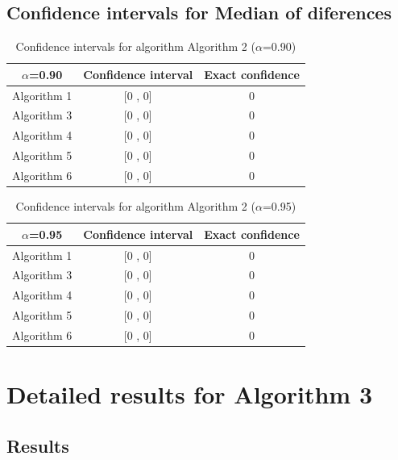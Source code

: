 \documentclass[a4paper,10pt]{article}
\begin{document}
\subsection{Confidence intervals for Median of diferences}

\begin{table}[!htp]
\centering\small
\begin{tabular}{
|c|c|c|}
\hline
 $\alpha$=0.90 & Confidence interval & Exact confidence \\ \hline 
Algorithm 1 & [0 , 0] & 0\\ \hline 
Algorithm 3 & [0 , 0] & 0\\ \hline 
Algorithm 4 & [0 , 0] & 0\\ \hline 
Algorithm 5 & [0 , 0] & 0\\ \hline 
Algorithm 6 & [0 , 0] & 0\\ \hline 

\end{tabular}
\caption{Confidence intervals for algorithm Algorithm 2 ($\alpha$=0.90)}
\end{table}
\begin{table}[!htp]
\centering\small
\begin{tabular}{
|c|c|c|}
\hline
 $\alpha$=0.95 & Confidence interval & Exact confidence \\ \hline 
Algorithm 1 & [0 , 0] & 0\\ \hline 
Algorithm 3 & [0 , 0] & 0\\ \hline 
Algorithm 4 & [0 , 0] & 0\\ \hline 
Algorithm 5 & [0 , 0] & 0\\ \hline 
Algorithm 6 & [0 , 0] & 0\\ \hline 

\end{tabular}
\caption{Confidence intervals for algorithm Algorithm 2 ($\alpha$=0.95)}
\end{table}

 \clearpage 


\section{Detailed results for Algorithm 3}


\subsection{Results}
\end{document}
